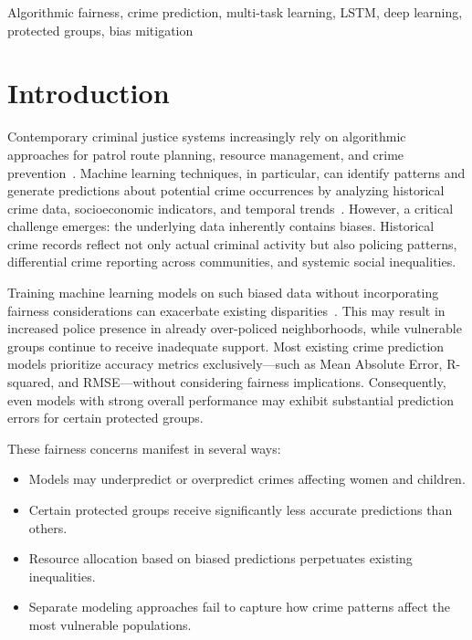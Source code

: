 \documentclass[conference]{IEEEtran}
\begin{document}
\begin{IEEEkeywords}
Algorithmic fairness, crime prediction, multi-task learning, LSTM, deep learning, protected groups, bias mitigation
\end{IEEEkeywords}

\section{Introduction}

Contemporary criminal justice systems increasingly rely on algorithmic approaches for patrol route planning, resource management, and crime prevention~\cite{perry2013predictive}. Machine learning techniques, in particular, can identify patterns and generate predictions about potential crime occurrences by analyzing historical crime data, socioeconomic indicators, and temporal trends~\cite{lum2016predict, richardson2019dirty}. However, a critical challenge emerges: the underlying data inherently contains biases. Historical crime records reflect not only actual criminal activity but also policing patterns, differential crime reporting across communities, and systemic social inequalities.

Training machine learning models on such biased data without incorporating fairness considerations can exacerbate existing disparities~\cite{angwin2016machine, barocas2016big}. This may result in increased police presence in already over-policed neighborhoods, while vulnerable groups continue to receive inadequate support. Most existing crime prediction models prioritize accuracy metrics exclusively---such as Mean Absolute Error, R-squared, and RMSE---without considering fairness implications. Consequently, even models with strong overall performance may exhibit substantial prediction errors for certain protected groups.

These fairness concerns manifest in several ways:
\begin{itemize}
    \item Models may underpredict or overpredict crimes affecting women and children.
    \item Certain protected groups receive significantly less accurate predictions than others.
    \item Resource allocation based on biased predictions perpetuates existing inequalities.
    \item Separate modeling approaches fail to capture how crime patterns affect the most vulnerable populations.
\end{itemize}
\end{document}
